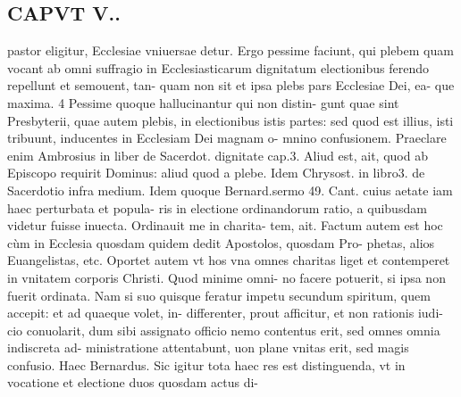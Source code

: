 \documentclass{article}
\begin{document}
\begin{pages}
\section*{CAPVT  V.. }
\marginpar{[ p.349 ]}\pstart pastor eligitur, Ecclesiae vniuersae detur.  \pend\pstart Ergo pessime faciunt, qui plebem quam vocant ab omni suffragio in Ecclesiasticarum dignitatum electionibus ferendo repellunt et semouent, tan- quam non sit et ipsa plebs pars Ecclesiae Dei, ea- que maxima. 4  \pend\pstart Pessime quoque hallucinantur qui non distin- gunt quae sint Presbyterii, quae autem plebis, in electionibus istis partes: sed quod est illius, isti tribuunt, inducentes in Ecclesiam Dei magnam o- mnino confusionem. Praeclare enim Ambrosius in liber  de Sacerdot. dignitate cap.3. Aliud est, ait, quod ab Episcopo requirit Dominus: aliud quod a plebe. Idem Chrysost. in libro3. de Sacerdotio infra medium. Idem quoque Bernard.sermo 49. Cant. cuius aetate iam haec perturbata et popula- ris in electione ordinandorum ratio, a quibusdam videtur fuisse inuecta. Ordinauit me in charita- tem, ait. Factum autem est hoc cùm in Ecclesia quosdam quidem dedit Apostolos, quosdam Pro- phetas, alios Euangelistas, etc. Oportet autem vt hos vna omnes charitas liget et contemperet in vnitatem corporis Christi. Quod minime omni- no facere potuerit, si ipsa non fuerit ordinata. Nam si suo quisque feratur impetu secundum spiritum, quem accepit: et ad quaeque volet, in- differenter, prout afficitur, et non rationis iudi- cio conuolarit, dum sibi assignato officio nemo contentus erit, sed omnes omnia indiscreta ad- ministratione attentabunt, uon plane vnitas erit, sed magis confusio. Haec Bernardus.  \pend\pstart Sic igitur tota haec res est distinguenda, vt in vocatione et electione duos quosdam actus di-  \pend

\end{pages}
\end{document}
